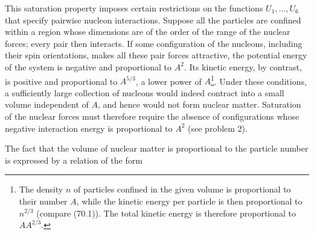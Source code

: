 This saturation property imposes certain restrictions on the functions $U_1,\ldots,U_6$ that specify pairwise nucleon interactions.
Suppose all the particles are confined within a region whose dimensions are of the order of the range of the nuclear forces; every pair then interacts.
If some configuration of the nucleons, including their spin orientations, makes all these pair forces attractive, the potential energy of the system is negative and proportional to $A^2$.
Its kinetic energy, by contrast, is positive and proportional to $A^{5/3}$, a lower power of $A$\footnote{The density $n$ of particles confined in the given volume is proportional to their number $A$, while the kinetic energy per particle is then proportional to $n^{2/3}$ (compare (70.1)). The total kinetic energy is therefore proportional to $AA^{2/3}$.}.
Under these conditions, a sufficiently large collection of nucleons would indeed contract into a small volume independent of $A$, and hence would not form nuclear matter.
Saturation of the nuclear forces must therefore require the absence of configurations whose negative interaction energy is proportional to $A^2$ (see problem 2).

The fact that the volume of nuclear matter is proportional to the particle number is expressed by a relation of the form
